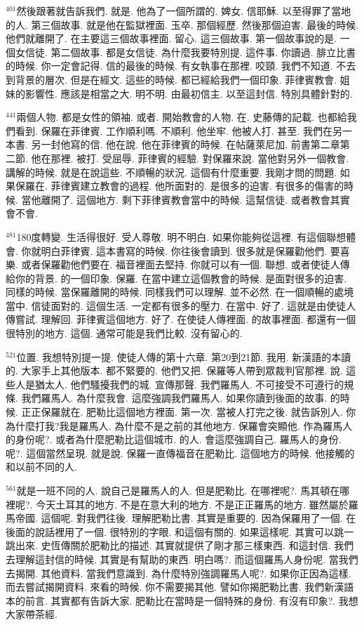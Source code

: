 \documentclass{book}
\begin{document}
$^{401}$然後跟著就告訴我們.
就是.
他為了一個所謂的.
婢女.
信耶穌.
以至得罪了當地的人.
第三個故事.
就是他在監獄裡面.
玉卒.
那個經歷.
然後那個迫害.
最後的時候.
他們就離開了.
在主要這三個故事裡面.
留心.
這三個故事.
第一個故事說的是.
一個女信徒.
第二個故事.
都是女信徒.
為什麼我要特別提.
這件事.
你讀過.
腓立比書的時候.
你一定會記得.
信的最後的時候.
有女執事在那裡.
咬頸.
我們不知道.
不去到背景的層次.
但是在經文.
這些的時候.
都已經給我們一個印象.
菲律賓教會.
姐妹的影響性.
應該是相當之大.
明不明.
由最初信主.
以至這封信.
特別具體針對的.

$^{441}$兩個人物.
都是女性的領袖.
或者.
開始教會的人物.
在.
史藤傳的記載.
也都給我們看到.
保羅在菲律賓.
工作順利嗎.
不順利.
他坐牢.
他被人打.
甚至.
我們在另一本書.
另一封他寫的信.
他在說.
他在菲律賓的時候.
在帖薩萊尼加.
前書第二章第二節.
他在那裡.
被打.
受屈辱.
菲律賓的經驗.
對保羅來說.
當他對另外一個教會.
講解的時候.
就是在說這些.
不順暢的狀況.
這個有什麼重要.
我剛才問的問題.
如果保羅在.
菲律賓建立教會的過程.
他所面對的.
是很多的迫害.
有很多的傷害的時候.
當他離開了.
這個地方.
剩下菲律賓教會當中的時候.
這幫信徒.
或者教會其實會不會.

$^{481}$180度轉變.
生活得很好.
受人尊敬.
明不明白.
如果你能夠從這裡.
有這個聯想體會.
你就明白菲律賓.
這本書寫的時候.
你往後會讀到.
很多就是保羅勸他們.
要喜樂.
或者保羅勸他們要在.
福音裡面去堅持.
你就可以有一個.
聯想.
或者使徒人傳給你的背景.
的一個印象.
保羅.
在當中建立這個教會的時候.
是面對很多的迫害.
同樣的時候.
當保羅離開的時候.
同樣我們可以理解.
並不必然.
在一個順暢的處境當中.
信徒面對的.
這個生活.
一定都有很多的壓力.
在當中.
好了.
這就是由使徒人傳嘗試.
理解回.
菲律賓這個地方.
好了.
在使徒人傳裡面.
的故事裡面.
都還有一個很特別的地方.
這個.
通常可能是我們比較.
沒有留心的.

$^{521}$位置.
我想特別提一提.
使徒人傳的第十六章.
第20到21節.
我用.
新漢語的本讀的.
大家手上其他版本.
都不緊要的.
他們又把.
保羅等人帶到眾裁判官那裡.
說.
這些人是猶太人.
他們騷擾我們的城.
宣傳那聲.
我們羅馬人.
不可接受不可遵行的規條.
我們羅馬人.
為什麼我會.
這麼強調我們羅馬人.
如果你讀到後面的故事.
的時候.
正正保羅就在.
肥勒比這個地方裡面.
第一次.
當被人打完之後.
就告訴別人.
你為什麼打我?我是羅馬人.
為什麼不是之前的其他地方.
保羅會突顯他.
作為羅馬人的身份呢?.
或者為什麼肥勒比這個城市.
的人.
會這麼強調自己.
羅馬人的身份.
呢?.
這個當然呈現.
就是說.
保羅一直傳福音在肥勒比.
這個地方的時候.
他接觸的和以前不同的人.

$^{561}$就是一班不同的人.
說自己是羅馬人的人.
但是肥勒比.
在哪裡呢?.
馬其頓在哪裡呢?.
今天土耳其的地方.
不是在意大利的地方.
不是正正羅馬的地方.
雖然屬於羅馬帝國.
這個呢.
對我們往後.
理解肥勒比書.
其實是重要的.
因為保羅用了一個.
在後面的說話裡用了一個.
很特別的字眼.
和這個有關的.
如果這樣呢.
其實可以跳一跳出來.
史恆傳關於肥勒比的描述.
其實就提供了剛才那三樣東西.
和這封信.
我們去理解這封信的時候.
其實是有幫助的東西.
明白嗎?.
而這個羅馬人身份呢.
當我們去揭開.
其他資料.
當我們意識到.
為什麼特別強調羅馬人呢?.
如果你正因為這樣.
而去嘗試揭開資料.
來看的時候.
你不需要揭其他.
譬如你揭肥勒比書.
我們新漢語本的前言.
其實都有告訴大家.
肥勒比在當時是一個特殊的身份.
有沒有印象?.
我想大家帶茶經.
\end{document}
